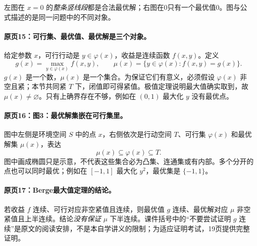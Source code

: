 \begin{center}
\end{center}
左图在 $x=0$ 的\emph{整条竖线段}都是合法最优解；右图在0只有一个最优值0。图与公式描述的是同一问题中的不同对象。


\paragraph{原页15：可行集、最优值、最优解是三个对象。}给定参数 $x$，可行行动是 $y\in\varphi(x)$，收益是连续函数 $f(x,y)$。定义
\[g(x)=\max_{y\in\varphi(x)}f(x,y),\qquad
\mu(x)=\{y\in\varphi(x):f(x,y)=g(x)\}.\]
$g(x)$ 是一个数，$\mu(x)$ 是一个集合。为保证它们有意义，必须假设 $\varphi(x)$ 非空且紧；本节共同紧 $T$ 下，闭值即可得紧值。极值定理说明最大值确实取到，故 $\mu(x)\ne\varnothing$。只有上确界存在不够，例如在 $(0,1)$ 最大化 $y$ 没有最优点。



\paragraph{原页16：图3：最优解集嵌在可行集里。}图中左侧是环境空间 $S$ 中的点 $x$，右侧依次是行动空间 $T$、可行集 $\varphi(x)$ 和最优解集 $\mu(x)$，表达
\[\mu(x)\subseteq\varphi(x)\subseteq T.\]
图中画成椭圆只是示意，不代表这些集合必为凸集、连通集或有内部。多个分开的点也可以同时最优；例如在 $[-1,1]$ 最大化 $y^2$，最优集是 $\{-1,1\}$。



\paragraph{原页17：Berge最大值定理的结论。}若收益 $f$ 连续、可行对应非空紧值且连续，则最优值 $g$ 连续、最优解对应 $\mu$ 非空紧值且上半连续。结论\emph{没有保证} $\mu$ 下半连续。课件括号中的“不要尝试证明 $g$ 连续”是原文的阅读安排，不是本自学讲义的限制；为适应证明考试，19页提供完整证明。

